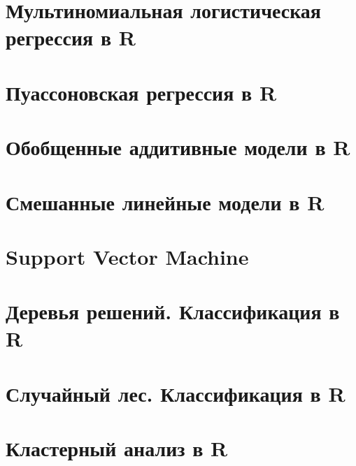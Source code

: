 \documentclass[
  letterpaper,
  DIV=11,
  numbers=noendperiod]{scrreprt}
\theoremstyle{definition}
\theoremstyle{remark}
\begin{document}

\chapter{Мультиномиальная логистическая регрессия в
R}\label{randan-multinomlogreg}


\chapter{Пуассоновская регрессия в R}\label{randan-poissonreg}


\chapter{Обобщенные аддитивные модели в R}\label{randan-gam}


\chapter{Смешанные линейные модели в R}\label{randan-glmm}


\chapter{Support Vector Machine}\label{andan-svm}


\chapter{Деревья решений. Классификация в R}\label{randan-treesclass}


\chapter{Случайный лес. Классификация в R}\label{randan-randforestclass}


\chapter{Кластерный анализ в R}\label{randan-cluster}
\end{document}
